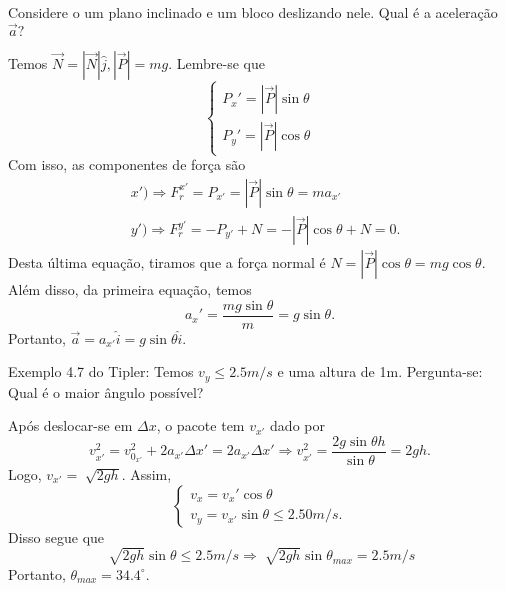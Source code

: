 \documentclass[physics_notes.tex]{subfiles}
\begin{document}
\begin{example}
	Considere o um plano inclinado e um bloco deslizando nele. Qual é a aceleração $\vec{a}?$
	\begin{center}
	\end{center}
	Temos $\vec{N} = |\vec{N}|\hat{j}, |\vec{P}|=mg.$ Lembre-se que
	$$
		\left\{\begin{array}{ll}
			P_{x}' = |\vec{P}|\sin{\theta} \\
			P_{y}' = |\vec{P}|\cos{\theta}
		\end{array}\right.
	$$
	Com isso, as componentes de força são
	\begin{align*}
		 & x') \Rightarrow F_{r}^{x'} = P_{x'} = |\vec{P}|\sin{\theta} = ma_{x'}      \\
		 & y') \Rightarrow F_{r}^{y'} = -P_{y'} + N = -|\vec{P}|\cos{\theta} + N = 0.
	\end{align*}
	Desta última equação, tiramos que a força normal é $N = |\vec{P}|\cos{\theta} = mg\cos{\theta}.$ Além disso,
	da primeira equação, temos
	$$
		a_{x}' = \frac{mg\sin{\theta}}{m} = g\sin{\theta}.
	$$
	Portanto, $\vec{a} = a_{x'}\hat{i} = g\sin{\theta}\hat{i}.$
\end{example}
\begin{example}
	Exemplo 4.7 do Tipler: Temos $v_{y}\leq 2.5m/s$ e uma altura de 1m. Pergunta-se: Qual é o maior ângulo possível?

	Após deslocar-se em $\Delta x$, o pacote tem $v_{x'}$ dado por
	$$
		v_{x'}^{2} = v_{0_{x'}}^{2} + 2 a_{x'}\Delta x' = 2a_{x'}\Delta x' \Rightarrow v_{x'}^{2} = \frac{2g\sin{\theta}h}{\sin{\theta}} = 2gh.
	$$
	Logo, $v_{x'} = \sqrt[]{2gh}$. Assim,
	$$
		\left\{\begin{array}{ll}
			v_{x} = v_{x}'\cos{\theta} \\
			v_{y} = v_{x'}\sin{\theta}\leq 2.50m/s.
		\end{array}\right.
	$$
	Disso segue que
	$$
		\sqrt[]{2gh}\sin{\theta}\leq 2.5m/s \Rightarrow \sqrt[]{2gh}\sin{\theta_{max}} = 2.5m/s
	$$
	Portanto, $\theta_{max} = 34.4^{\circ}.$
\end{example}
\end{document}
